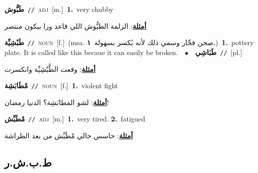 \documentclass[10pt,a4paper,twoside]{article} %
\begin{document}
\begin{multicols}{2}
{{{{{{{{{{{{{\setlength\topsep{0pt}\textbf{\foreignlanguage{arabic}{طَبُّوش}}\ {\color{gray}\texttt{//}\color{black}}\ \textsc{adj}\ [m.]\ \textbf{1.}~very chubby\  \begin{flushright}\color{gray}\foreignlanguage{arabic}{\textbf{\underline{\foreignlanguage{arabic}{أمثلة}}}: الزلمة الطبُّوش اللي قاعد ورا بيكون منتصر}\end{flushright}\color{black}} \vspace{2mm}

{\setlength\topsep{0pt}\textbf{\foreignlanguage{arabic}{طَبْشِيِّة}}\ {\color{gray}\texttt{//}\color{black}}\ \textsc{noun}\ [f.]\ \color{gray}(msa. \foreignlanguage{arabic}{صحن فخّار وسمي ذلك لأنه يُكسر بسهولة}~\foreignlanguage{arabic}{\textbf{١.}})\color{black}\ \textbf{1.}~pottery plate. It is called like this becaue it can easily be broken.\ \ $\bullet$\ \ \setlength\topsep{0pt}\textbf{\foreignlanguage{arabic}{طَبَاشِي}}\ {\color{gray}\texttt{//}\color{black}}\ [pl.]\  \begin{flushright}\color{gray}\foreignlanguage{arabic}{\textbf{\underline{\foreignlanguage{arabic}{أمثلة}}}: وقعت الطَّبْشِيِّة وانكسرت}\end{flushright}\color{black}} \vspace{2mm}

{\setlength\topsep{0pt}\textbf{\foreignlanguage{arabic}{مْطَابَشِة}}\ {\color{gray}\texttt{//}\color{black}}\ \textsc{noun}\ [f.]\ \textbf{1.}~violent fight\  \begin{flushright}\color{gray}\foreignlanguage{arabic}{\textbf{\underline{\foreignlanguage{arabic}{أمثلة}}}: لشو المطابَشِة؟ الدنيا رمضان!}\end{flushright}\color{black}} \vspace{2mm}

{\setlength\topsep{0pt}\textbf{\foreignlanguage{arabic}{مْطَبِّش}}\ {\color{gray}\texttt{//}\color{black}}\ \textsc{adj}\ [m.]\ \textbf{1.}~very tired.  \textbf{2.}~fatigued\  \begin{flushright}\color{gray}\foreignlanguage{arabic}{\textbf{\underline{\foreignlanguage{arabic}{أمثلة}}}: حاسس حالي مْطَبِّش من بعد الطراشة}\end{flushright}\color{black}} \vspace{2mm}

\vspace{-3mm}
\subsection*{\color{blue}\foreignlanguage{arabic}{ط.ب.ش.ر}\color{blue}{}} 

}}}}}}}}}}}}
\end{multicols}
\end{document}
